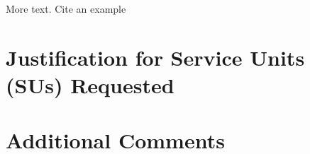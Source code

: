 \documentclass{proposalnsf}
\begin{document}
More text.  Cite an example \cite[]{sample_ref}

\section*{Justification for Service Units (SUs) Requested}

\section*{Additional Comments}





\newpage
{}
\renewcommand{\thepage} {E--\arabic{page}}




\newpage
{}
\renewcommand{\thepage} {G--\arabic{page}}
\end{document}
